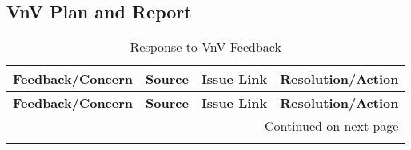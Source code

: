 \documentclass{article}
\begin{document}
\subsection{VnV Plan and Report} \label{subsec:vnv_feedback}
\begin{longtable}{|p{5cm}|p{1.5cm}|p{2cm}|p{5cm}|}
\caption{Response to VnV Feedback} \\
\hline
\textbf{Feedback/Concern} & \textbf{Source} & \textbf{Issue Link} & \textbf{Resolution/Action} \\ \hline
\endfirsthead
\hline
\textbf{Feedback/Concern} & \textbf{Source} & \textbf{Issue Link} & \textbf{Resolution/Action} \\ \hline
\endhead
\hline \multicolumn{4}{r}{{Continued on next page}} \\ \hline
\endfoot
\hline
\endlastfoot


\end{longtable}
\end{document}
